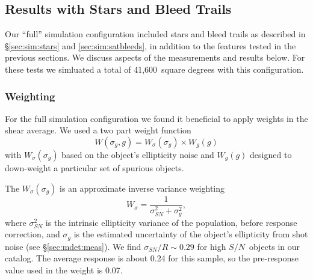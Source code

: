 \documentclass[twocolumn,twocolappendix,astrosym]{openjournal}
\newcommand{\snr}{$S/N$}
\newcommand{\fullarea}{41,600}
\begin{document}
\subsection{Results with Stars and Bleed Trails} \label{sec:results:full}

Our ``full'' simulation configuration included stars and bleed trails as
described in \S \ref{sec:sim:stars} and \ref{sec:sim:satbleeds}, in addition to
the features tested in the previous sections.   We discuss aspects of the
measurements and results below. For these tests we simluated a total of \fullarea\
square degrees with this configuration.

\subsubsection{Weighting}

For the full simulation configuration we found it beneficial to apply weights
in the shear average.  We used a two part weight function
\begin{equation}
    W(\sigma_g, g) = W_\sigma (\sigma_g) \times W_g(g)
\end{equation}
with $W_\sigma(\sigma_g)$ based on the object's ellipticity noise and $W_g(g)$
designed to down-weight a particular set of spurious objects.

The $W_\sigma(\sigma_g)$ is an approximate inverse variance weighting
\begin{equation} \label{eq:wsigma}
    W_\sigma = \frac{1}{\sigma_{SN}^2 + \sigma_g^2},
\end{equation}
where $\sigma^2_{SN}$ is the intrinsic ellipticity variance of the population,
before response correction, and $\sigma_g$ is the estimated uncertainty of the
object's ellipticity from shot noise (see \S \ref{sec:mdet:meas}).  We find
$\sigma_{SN}/R \sim 0.29$ for high \snr\ objects in our catalog.  The average
response is about 0.24 for this sample, so the pre-response value used
in the weight is 0.07.
\end{document}
